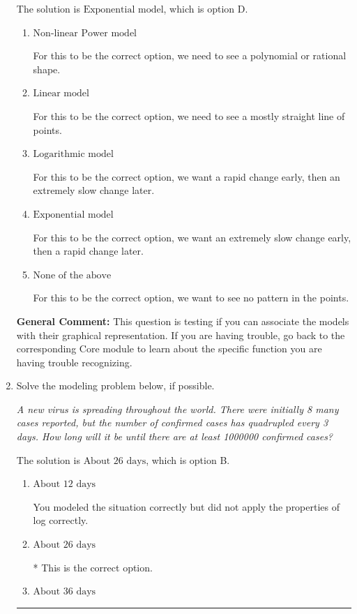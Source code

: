 \documentclass{extbook}[14pt]
\newcommand{\litem}[1]{\item #1

\rule{\textwidth}{0.4pt}}
\begin{document}
\begin{enumerate}
{The solution is \( \text{Exponential model} \), which is option D.\begin{enumerate}[label=\Alph*.]
\item \( \text{Non-linear Power model} \)

For this to be the correct option, we need to see a polynomial or rational shape.
\item \( \text{Linear model} \)

For this to be the correct option, we need to see a mostly straight line of points.
\item \( \text{Logarithmic model} \)

For this to be the correct option, we want a rapid change early, then an extremely slow change later.
\item \( \text{Exponential model} \)

For this to be the correct option, we want an extremely slow change early, then a rapid change later.
\item \( \text{None of the above} \)

For this to be the correct option, we want to see no pattern in the points.
\end{enumerate}

\textbf{General Comment:} This question is testing if you can associate the models with their graphical representation. If you are having trouble, go back to the corresponding Core module to learn about the specific function you are having trouble recognizing.
}
\litem{
Solve the modeling problem below, if possible.

\begin{center}
    \textit{ A new virus is spreading throughout the world. There were initially 8 many cases reported, but the number of confirmed cases has quadrupled every 3 days. How long will it be until there are at least 1000000 confirmed cases? }
\end{center}
The solution is \( \text{About } 26 \text{ days} \), which is option B.\begin{enumerate}[label=\Alph*.]
\item \( \text{About } 12 \text{ days} \)

You modeled the situation correctly but did not apply the properties of log correctly.
\item \( \text{About } 26 \text{ days} \)

* This is the correct option.
\item \( \text{About } 36 \text{ days} \)


\end{enumerate}}
\end{enumerate}
\end{document}
